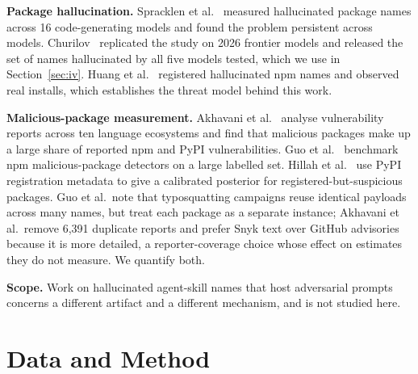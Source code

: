 \documentclass[10pt,conference]{IEEEtran}
\begin{document}
\textbf{Package hallucination.} Spracklen et al.~\cite{spracklen2024}
measured hallucinated package names across 16 code-generating models and
found the problem persistent across models. Churilov~\cite{churilov2026}
replicated the study on 2026 frontier models and released the set of names
hallucinated by all five models tested, which we use in
Section~\ref{sec:iv}. Huang et al.~\cite{huang2026} registered hallucinated
npm names and observed real installs, which establishes the threat model
behind this work.

\textbf{Malicious-package measurement.} Akhavani et al.~\cite{akhavani2025}
analyse vulnerability reports across ten language ecosystems and find that
malicious packages make up a large share of reported npm and PyPI
vulnerabilities. Guo et al.~\cite{guo2026} benchmark npm malicious-package
detectors on a large labelled set. Hillah et al.~\cite{hillah2026} use PyPI
registration metadata to give a calibrated posterior for
registered-but-suspicious packages. Guo et al.\ note that typosquatting
campaigns reuse identical payloads across many names, but treat each
package as a separate instance; Akhavani et al.\ remove 6,391 duplicate reports and prefer
Snyk text over GitHub advisories because it is more detailed, a
reporter-coverage choice whose effect on estimates they do not measure. We
quantify both.

\textbf{Scope.} Work on hallucinated agent-skill names that host adversarial
prompts~\cite{spira2026} concerns a different artifact and a different
mechanism, and is not studied here.

\section{Data and Method}
\label{sec:method}
\end{document}

